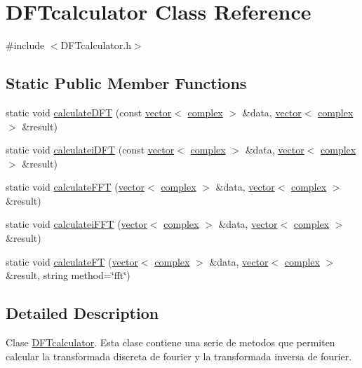 \hypertarget{class_d_f_tcalculator}{\section{D\-F\-Tcalculator Class Reference}
\label{class_d_f_tcalculator}
}


{\ttfamily \#include $<$D\-F\-Tcalculator.\-h$>$}

\subsection*{Static Public Member Functions}
\begin{DoxyCompactItemize}
\item 
static void \hyperlink{class_d_f_tcalculator_a2361911a48bcb73d98e00221ccc40181}{calculate\-D\-F\-T} (const \hyperlink{classvector}{vector}$<$ \hyperlink{classcomplex}{complex} $>$ \&data, \hyperlink{classvector}{vector}$<$ \hyperlink{classcomplex}{complex} $>$ \&result)
\item 
static void \hyperlink{class_d_f_tcalculator_a96b2d7d430d87789ced5f02ed2368ed5}{calculatei\-D\-F\-T} (const \hyperlink{classvector}{vector}$<$ \hyperlink{classcomplex}{complex} $>$ \&data, \hyperlink{classvector}{vector}$<$ \hyperlink{classcomplex}{complex} $>$ \&result)
\item 
static void \hyperlink{class_d_f_tcalculator_a3270facd7e07b46847705844eb49f01c}{calculate\-F\-F\-T} (\hyperlink{classvector}{vector}$<$ \hyperlink{classcomplex}{complex} $>$ \&data, \hyperlink{classvector}{vector}$<$ \hyperlink{classcomplex}{complex} $>$ \&result)
\item 
static void \hyperlink{class_d_f_tcalculator_ac64908a0b491db9cb19d6f84e9590fea}{calculatei\-F\-F\-T} (\hyperlink{classvector}{vector}$<$ \hyperlink{classcomplex}{complex} $>$ \&data, \hyperlink{classvector}{vector}$<$ \hyperlink{classcomplex}{complex} $>$ \&result)
\item 
static void \hyperlink{class_d_f_tcalculator_a00b116e7dfbb17f17bc8494f497ea12f}{calculate\-F\-T} (\hyperlink{classvector}{vector}$<$ \hyperlink{classcomplex}{complex} $>$ \&data, \hyperlink{classvector}{vector}$<$ \hyperlink{classcomplex}{complex} $>$ \&result, string method=\char`\"{}fft\char`\"{})
\end{DoxyCompactItemize}


\subsection{Detailed Description}
Clase \hyperlink{class_d_f_tcalculator}{D\-F\-Tcalculator}. Esta clase contiene una serie de metodos que permiten calcular la transformada discreta de fourier y la transformada inversa de fourier. 

